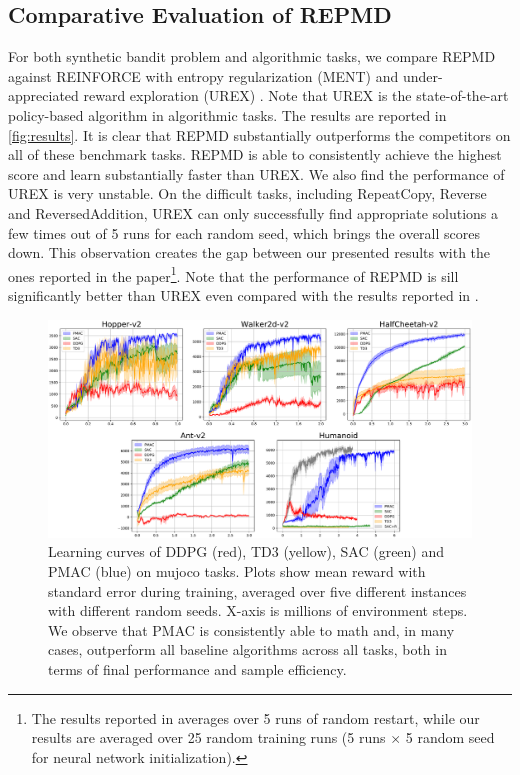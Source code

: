 \subsection{Comparative Evaluation of REPMD}

For both synthetic bandit problem and algorithmic tasks, we compare REPMD against REINFORCE with entropy regularization (MENT) \citep{williams1992simple} and under-appreciated reward exploration (UREX) \citep{nachum2017improving}. Note that UREX is the state-of-the-art policy-based algorithm in algorithmic tasks. The results are reported in \cref{fig:results}. It is clear that REPMD substantially outperforms the competitors on all of these benchmark tasks. REPMD is able to consistently achieve the highest score and learn substantially faster than UREX. We also find the performance of UREX is very unstable. On the difficult tasks, including RepeatCopy, Reverse and ReversedAddition, UREX can only successfully find appropriate solutions a few times out of 5 runs for each random seed, which brings the overall scores down. This observation creates the gap between our presented results with the ones reported in the paper\footnote{The results reported in \citet{nachum2017improving} averages over 5 runs of random restart, while our results are averaged over 25 random training runs (5 runs $\times$ 5 random seed for neural network initialization). }. Note that the performance of REPMD is sill significantly better than UREX even compared with the results reported in \citet{nachum2017improving}. 

\begin{figure}[t]
\begin{center}
\includegraphics[width=0.8\linewidth]{./mujoco-results.pdf}
\end{center}
\caption{
Learning curves of DDPG (red), TD3 (yellow), SAC (green) and PMAC (blue) on mujoco tasks. Plots show mean reward with standard error during training, averaged over five different instances with different random seeds. X-axis is millions of environment steps. We observe that PMAC is consistently able to math and, in many cases, outperform all baseline algorithms across all tasks, both in terms of final performance and sample efficiency. }
\label{fig:result_mujoco } 
\end{figure}

